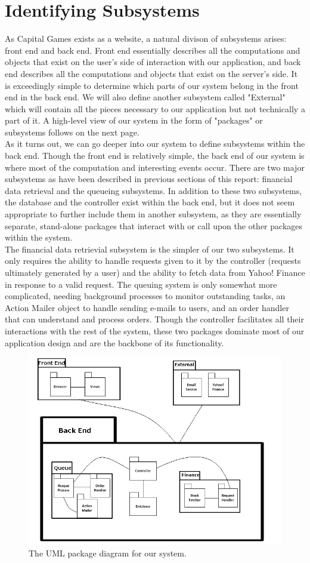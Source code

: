 \section{Identifying Subsystems}
As Capital Games exists as a website, a natural divison of subsystems arises: front end and back end. Front end essentially describes all the computations and objects that exist on the user's side of interaction with our application, and back end describes all the computations and objects that exist on the server's side. It is exceedingly simple to determine which parts of our system belong in the front end in the back end. We will also define another subsystem called "External" which will contain all the pieces necessary to our application but not technically a part of it. A high-level view of our system in the form of "packages" or subsystems follows on the next page. \\

As it turns out, we can go deeper into our system to define subsystems within the back end. Though the front end is relatively simple, the back end of our system is where most of the computation and interesting events occur. There are two major subsystems as have been described in previous sections of this report: financial data retrieval and the queueing subsystems. In addition to these two subsystems, the database and the controller exist within the back end, but it does not seem appropriate to further include them in another subsystem, as they are essentially separate, stand-alone packages that interact with or call upon the other packages within the system. \\

The financial data retrievial subsystem is the simpler of our two subsystems. It only requires the ability to handle requests given to it by the controller (requests ultimately generated by a user) and the ability to fetch data from Yahoo! Finance in response to a valid request. The queuing system is only somewhat more complicated, needing background processes to monitor outstanding tasks, an Action Mailer object to handle sending e-mails to users, and an order handler that can understand and process orders. Though the controller facilitates all their interactions with the rest of the system, these two packages dominate most of our application design and are the backbone of its functionality. \\

\begin{figure}[H]
\centering
\includegraphics[width=7in]{./img/package.png}
\caption{The UML package diagram for our system.}
\end{figure}